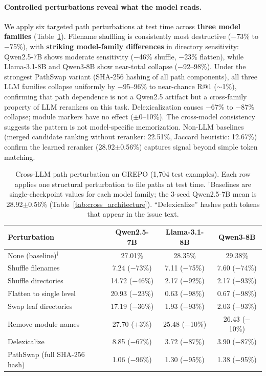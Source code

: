 \documentclass{article}
\begin{document}
\paragraph{Controlled perturbations reveal what the model reads.}
We apply six targeted path perturbations at test time across \textbf{three model families} (Table~\ref{tab:path_perturb}).
Filename shuffling is consistently most destructive ($-$73\% to $-$75\%), with \textbf{striking model-family differences} in directory sensitivity: Qwen2.5-7B shows moderate sensitivity ($-$46\% shuffle, $-$23\% flatten), while Llama-3.1-8B and Qwen3-8B show near-total collapse ($-$92--98\%).
Under the strongest PathSwap variant (SHA-256 hashing of all path components), all three LLM families collapse uniformly by $-$95--96\% to near-chance R@1 ($\sim$1\%), confirming that path dependence is not a Qwen2.5 artifact but a cross-family property of LLM rerankers on this task.
Delexicalization causes $-$67\% to $-$87\% collapse; module markers have no effect ($\pm$0--10\%).
The cross-model consistency suggests the pattern is not model-specific memorization.
Non-LLM baselines (merged candidate ranking without reranker: 22.51\%, Jaccard heuristic: 12.67\%) confirm the learned reranker (28.92$\pm$0.56\%) captures signal beyond simple token matching.

\begin{table}[t]
\centering
\caption{Cross-LLM path perturbation on GREPO (1,704 test examples). Each row applies one structural perturbation to file paths at test time. $^\dagger$Baselines are single-checkpoint values for each model family; the 3-seed Qwen2.5-7B mean is 28.92$\pm$0.56\% (Table~\ref{tab:cross_architecture}). ``Delexicalize'' hashes path tokens that appear in the issue text.}
\label{tab:path_perturb}
\small
\begin{tabular}{lccc}
\toprule
\textbf{Perturbation} & \textbf{Qwen2.5-7B} & \textbf{Llama-3.1-8B} & \textbf{Qwen3-8B} \\
\midrule
None (baseline)$^\dagger$ & 27.01\% & 28.35\% & 29.38\% \\
\midrule
Shuffle filenames & 7.24 ($-$73\%) & 7.11 ($-$75\%) & 7.60 ($-$74\%) \\
Shuffle directories & 14.72 ($-$46\%) & 2.17 ($-$92\%) & 2.17 ($-$93\%) \\
Flatten to single level & 20.93 ($-$23\%) & 0.63 ($-$98\%) & 0.67 ($-$98\%) \\
Swap leaf directories & 17.19 ($-$36\%) & 1.93 ($-$93\%) & 2.03 ($-$93\%) \\
Remove module names & 27.70 ($+$3\%) & 25.48 ($-$10\%) & 26.43 ($-$10\%) \\
Delexicalize & 8.85 ($-$67\%) & 3.72 ($-$87\%) & 3.90 ($-$87\%) \\
PathSwap (full SHA-256 hash) & 1.06 ($-$96\%) & 1.30 ($-$95\%) & 1.38 ($-$95\%) \\
\bottomrule
\end{tabular}
\end{table}
\end{document}
